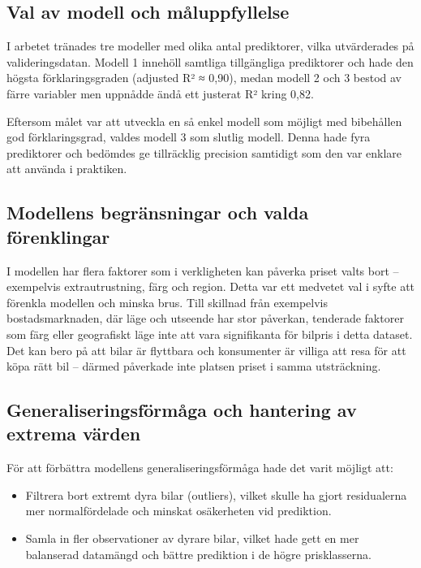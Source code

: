 \documentclass[
  letterpaper,
  DIV=11,
  numbers=noendperiod]{scrreprt}
\begin{document}
\subsection{Val av modell och
måluppfyllelse}\label{val-av-modell-och-muxe5luppfyllelse}

I arbetet tränades tre modeller med olika antal prediktorer, vilka
utvärderades på valideringsdatan. Modell 1 innehöll samtliga
tillgängliga prediktorer och hade den högsta förklaringsgraden (adjusted
R² ≈ 0,90), medan modell 2 och 3 bestod av färre variabler men uppnådde
ändå ett justerat R² kring 0,82.

Eftersom målet var att utveckla en så enkel modell som möjligt med
bibehållen god förklaringsgrad, valdes modell 3 som slutlig modell.
Denna hade fyra prediktorer och bedömdes ge tillräcklig precision
samtidigt som den var enklare att använda i praktiken.

\subsection{Modellens begränsningar och valda
förenklingar}\label{modellens-begruxe4nsningar-och-valda-fuxf6renklingar}

I modellen har flera faktorer som i verkligheten kan påverka priset
valts bort -- exempelvis extrautrustning, färg och region. Detta var ett
medvetet val i syfte att förenkla modellen och minska brus. Till
skillnad från exempelvis bostadsmarknaden, där läge och utseende har
stor påverkan, tenderade faktorer som färg eller geografiskt läge inte
att vara signifikanta för bilpris i detta dataset. Det kan bero på att
bilar är flyttbara och konsumenter är villiga att resa för att köpa rätt
bil -- därmed påverkade inte platsen priset i samma utsträckning.

\subsection{Generaliseringsförmåga och hantering av extrema
värden}\label{generaliseringsfuxf6rmuxe5ga-och-hantering-av-extrema-vuxe4rden}

För att förbättra modellens generaliseringsförmåga hade det varit
möjligt att:

\begin{itemize}
\item
  Filtrera bort extremt dyra bilar (outliers), vilket skulle ha gjort
  residualerna mer normalfördelade och minskat osäkerheten vid
  prediktion.
\item
  Samla in fler observationer av dyrare bilar, vilket hade gett en mer
  balanserad datamängd och bättre prediktion i de högre prisklasserna.
\end{itemize}
\end{document}
